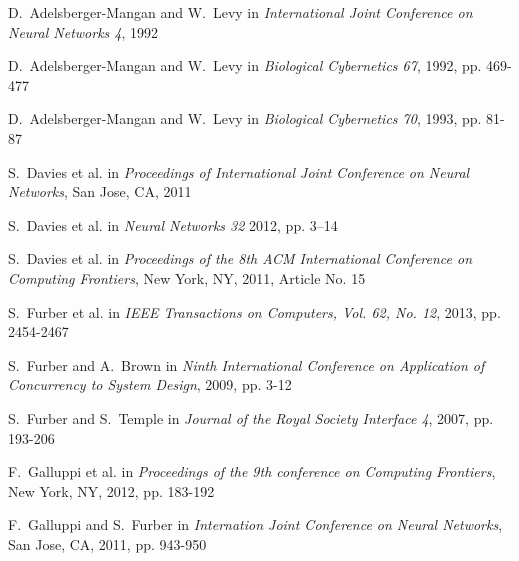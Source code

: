 \documentclass[journal]{./sty/IEEEtran}
\begin{document}

%
%
%


\begin{thebibliography}{23}

D.~Adelsberger-Mangan and W.~Levy in \emph{International Joint Conference on Neural Networks 4}, 1992

D.~Adelsberger-Mangan and W.~Levy in \emph{Biological Cybernetics 67}, 1992, pp. 469-477

D.~Adelsberger-Mangan and W.~Levy in \emph{Biological Cybernetics 70}, 1993, pp. 81-87

S.~Davies et al. in \emph{Proceedings of International Joint Conference on Neural Networks}, San Jose, CA, 2011

S.~Davies et al. in \emph{Neural Networks 32} 2012, pp. 3–14

S.~Davies et al. in \emph{Proceedings of the 8th ACM International Conference on Computing Frontiers}, New York, NY, 2011, Article No. 15 

S.~Furber et al. in \emph{IEEE Transactions on Computers, Vol. 62, No. 12}, 2013, pp. 2454-2467

S.~Furber and A.~Brown in \emph{Ninth International Conference on Application of Concurrency to System Design}, 2009, pp. 3-12

S.~Furber and S.~Temple in \emph{Journal of the Royal Society Interface 4}, 2007, pp. 193-206

F.~Galluppi et al. in \emph{Proceedings of the 9th conference on Computing Frontiers}, New York, NY, 2012, pp. 183-192

F.~Galluppi and S.~Furber in \emph{Internation Joint Conference on Neural Networks}, San Jose, CA, 2011, pp. 943-950 


\end{thebibliography}
\end{document}
